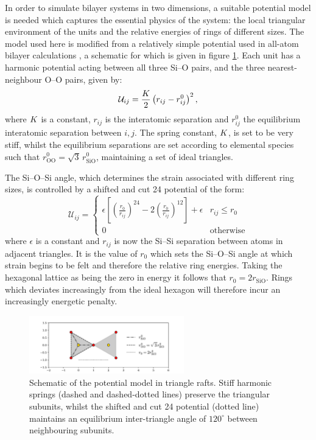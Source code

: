 In order to simulate bilayer systems in two dimensions, a suitable potential model is needed which captures the essential physics of the system: the local triangular environment of the \sioiii{} units and the relative energies of rings of different sizes. 
The model used here is modified from a relatively simple potential used in all\--atom bilayer calculations \cite{Wilson2013,Wilson2018}, a schematic for which is given in figure \ref{fig:trpotmodel}.
Each \sioiii{} unit has a harmonic potential acting between all three Si\---O pairs, and the three nearest\--neighbour O\---O pairs, given by:
\begin{equation}
	\label{eq:harmonic}
	\mathcal{U}_{ij} = \frac{K}{2}\left(r_{ij}-r_{ij}^{0}\right)^{2},
\end{equation}
where $K$ is a constant, $r_{ij}$ is the interatomic separation and $r_{ij}^{0}$ the equilibrium interatomic separation between $i,j$. 
The spring constant, $K$, is set to be very stiff, whilst the equilibrium separations are set according to elemental species such that $r_{\text{OO}}^{0}=\sqrt{3}\,r_{\text{SiO}}^{0}$, maintaining a set of ideal \sioiii{} triangles. 

The Si\---O\---Si angle, which determines the strain associated with different ring sizes, is controlled by a shifted and cut 24 potential of the form:
\begin{equation}
	\mathcal{U}_{ij} = 
	\begin{cases}
	\epsilon \left[ \left(\frac{r_{0}}{r_{ij}}\right)^{24}-2\left(\frac{r_{0}}{r_{ij}}\right)^{12} \right] + \epsilon & r_{ij}\leq r_{0} \\
	0 & \text{otherwise}
	\end{cases}
\end{equation}
where $\epsilon$ is a constant and $r_{ij}$ is now the Si\---Si separation between atoms in adjacent triangles. 
It is the value of $r_{0}$ which sets the Si\---O\---Si angle at which strain begins to be felt and therefore the relative ring energies.
Taking the hexagonal lattice as being the zero in energy it follows that $r_{0}=2r_{\text{SiO}}$.
Rings which deviates increasingly from the ideal hexagon will therefore incur an increasingly energetic penalty.

\begin{figure}[bt]
     \centering
  
         \includegraphics[width=0.6\textwidth]{./figures/bilayers/tr_pot_model.pdf}
 
     \caption{Schematic of the potential model in triangle rafts. Stiff harmonic springs (dashed and dashed\--dotted lines) preserve the triangular subunits, whilst the shifted and cut 24 potential (dotted line) maintains an equilibrium inter\--triangle angle of $120^\circ$ between neighbouring subunits.}
     \label{fig:trpotmodel}
\end{figure}

